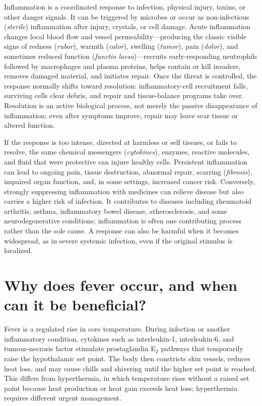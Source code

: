 \documentclass[11pt,oneside]{report}
\begin{document}
Inflammation is a coordinated response to infection, physical injury, toxins,
or other danger signals. It can be triggered by microbes or occur as non-infectious (\emph{sterile})
inflammation after injury, crystals, or cell damage. Acute inflammation changes
local blood flow and vessel permeability—producing the classic visible signs of
redness (\emph{rubor}), warmth (\emph{calor}), swelling (\emph{tumor}), pain
(\emph{dolor}), and sometimes reduced function (\emph{functio laesa})—recruits
early-responding neutrophils followed by macrophages and plasma proteins, helps
contain or kill invaders, removes damaged material, and initiates repair.
Once the threat is
controlled, the response normally shifts toward resolution: inflammatory-cell
recruitment falls, surviving cells clear debris, and repair and tissue-balance
programs take over. Resolution is an active biological process, not merely the
passive disappearance of inflammation; even after symptoms improve, repair may
leave scar tissue or altered function.

If the response is too intense, directed at harmless or self tissues, or fails
to resolve, the same chemical messengers (\emph{cytokines}), enzymes, reactive
molecules, and fluid that were protective can injure healthy cells. Persistent
inflammation can lead to ongoing pain, tissue destruction, abnormal repair,
scarring (\emph{fibrosis}), impaired organ function, and, in some settings,
increased cancer risk. Conversely, strongly suppressing inflammation with
medicines can relieve disease but also carries a higher risk of infection. It contributes to diseases
including rheumatoid arthritis, asthma, inflammatory bowel disease,
atherosclerosis, and some neurodegenerative conditions; inflammation is often
one contributing process rather than the sole cause. A response can also be
harmful when it becomes widespread, as in severe systemic infection, even if
the original stimulus is localized.

\section{Why does fever occur, and when can it be beneficial?}

Fever is a regulated rise in core temperature. During infection or another
inflammatory condition, cytokines such as interleukin-1, interleukin-6, and
tumour-necrosis factor stimulate prostaglandin E$_2$ pathways that temporarily
raise the hypothalamic set point. The body then constricts skin vessels, reduces
heat loss, and may cause chills and shivering until the higher set point is
reached. This differs from hyperthermia, in which temperature rises without a
raised set point because heat production or heat gain exceeds heat loss;
hyperthermia requires different urgent management.
\end{document}
